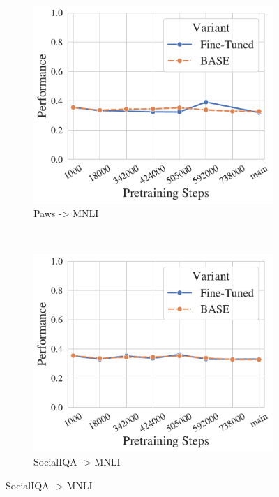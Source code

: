 \begin{figure}[t!]
    \centering
    \begin{subfigure}[b]{0.3\textwidth}
    \includegraphics[width=\the\columnwidth]{figures/fig_files/cross-task/sft_evalmnli_matched-trainpaws.pdf}
        \caption{Paws -> MNLI}
    \end{subfigure}%
    ~ 
    \begin{subfigure}[b]{0.3\textwidth}
    \includegraphics[width=\the\columnwidth]{figures/fig_files/cross-task/sft_evalmnli_matched-trainsocialiqa.pdf}
        \caption{SocialIQA -> MNLI}

\end{subfigure}
\end{figure}

